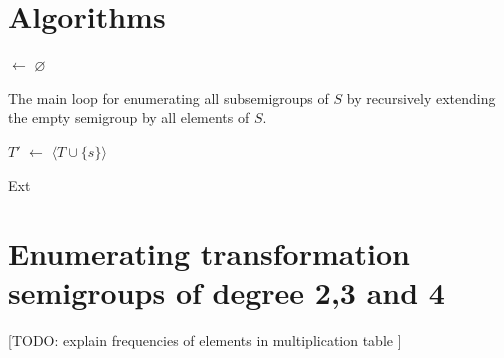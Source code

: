 \documentclass{amsart}
\newcommand{\Sub}{\mathbf{Sub}}
\newcommand{\todo}[1]{ \small \textsf{[TODO:  #1 ]} \normalsize}
\theoremstyle{plain}
\theoremstyle{definition}
\begin{document}
\section{Algorithms}
\begin{algorithm}
\Output{$\Sub(S)$}
\BlankLine
\Name{}

\subs $\leftarrow$ $\varnothing$
\Return{\subs}
\caption{The main loop for enumerating all subsemigroups of $S$ by recursively extending the empty semigroup by all elements of $S$.}
\label{alg:basicloop}
\end{algorithm}

\begin{algorithm}
\BlankLine
\Name{}

$T'$ $\leftarrow$ $\langle T\cup\{s\}\rangle$\\
\caption{Ext}
\label{alg:basicextend}
\end{algorithm}


\section{Enumerating transformation semigroups of degree 2,3 and 4}

\todo{explain frequencies of elements in multiplication table}



\end{document}

